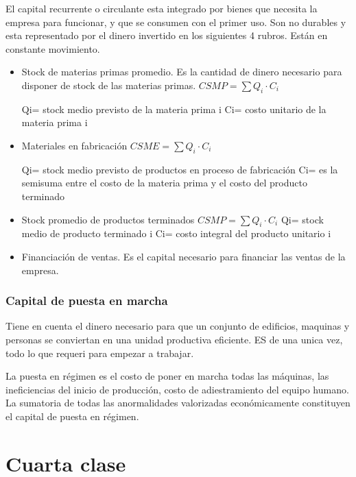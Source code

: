 \documentclass[titlepage,a4paper]{article}
\begin{document}
El capital recurrente o circulante esta integrado por bienes que necesita la empresa para funcionar, y que se consumen con el primer uso. Son no durables y esta representado por el dinero invertido en los siguientes 4 rubros. Están en constante movimiento.
\begin{itemize}
    \item Stock de materias primas promedio. Es la cantidad de dinero necesario para disponer de stock de las materias primas. 
        \begin{math}
        CSMP = \sum Q_i \cdot C_i
        \end{math}
        
        Qi= stock medio previsto de la materia prima i
        Ci= costo unitario de la materia prima i
    \item Materiales en fabricación
        \begin{math}
        CSME = \sum Q_i \cdot C_i
        \end{math}
        
        Qi= stock medio previsto de productos en proceso de fabricación
        Ci= es la semisuma entre el costo de la materia prima y el costo del producto terminado
    \item Stock promedio de productos terminados
        \begin{math}
        CSMP = \sum Q_i \cdot C_i
        \end{math}
        Qi= stock medio de producto terminado i
        Ci= costo integral del producto unitario i
    \item Financiación de ventas. Es el capital necesario para financiar las ventas de la empresa.
\end{itemize}

\subsubsection*{Capital de puesta en marcha}
Tiene en cuenta el dinero necesario para que un conjunto de edificios, maquinas y personas se conviertan en una unidad productiva eficiente. ES de una unica vez, todo lo que requeri para empezar a trabajar.

La puesta en régimen es el costo de poner en marcha todas las máquinas, las ineficiencias del inicio de producción, costo de adiestramiento del equipo humano. La sumatoria de todas las anormalidades valorizadas económicamente constituyen el capital de puesta en régimen.

\section*{Cuarta clase}
\end{document}
